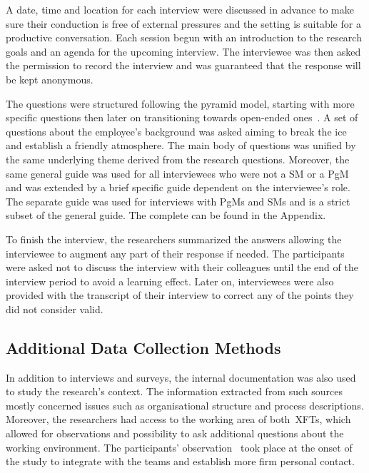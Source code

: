 A date, time and location for each interview were discussed in advance to make sure their conduction is free of external pressures and the setting is suitable for a productive conversation. Each session begun with an introduction to the research goals and an agenda for the upcoming interview. The interviewee was then asked the permission to record the interview and was guaranteed that the response will be kept anonymous.

The questions were structured following the pyramid model, starting with more specific questions then later on transitioning towards open-ended ones~\citep{runeson2012CaseStudyResearchInSE}. A set of questions about the employee's background was asked aiming to break the ice and establish a friendly atmosphere. The main body of questions was unified by the same underlying theme derived from the research questions. Moreover, the same general guide was used for all interviewees who were not a \ac{SM} or a \ac{PgM} and was extended by a brief specific guide dependent on the interviewee's role. The separate guide was used for interviews with \acp{PgM} and \acp{SM} and is a strict subset of the general guide. The complete  can be found in the Appendix.

To finish the interview, the researchers summarized the answers allowing the interviewee to augment any part of their response if needed. The participants were asked not to discuss the interview with their colleagues until the end of the interview period to avoid a learning effect. Later on, interviewees were also provided with the transcript of their interview to correct any of the points they did not consider valid.

\subsection{Additional Data Collection Methods}

In addition to interviews and surveys, the internal documentation was also used to study the research's context. The information extracted from such sources mostly concerned issues such as organisational structure and process descriptions.
Moreover, the researchers had access to the working area of both~\acp{XFT}, which allowed for observations and possibility to ask additional questions about the working environment. The participants' observation~\citep{Lethbridge05studyingsoftware} took place at the onset of the study to integrate with the teams and establish more firm personal contact.

